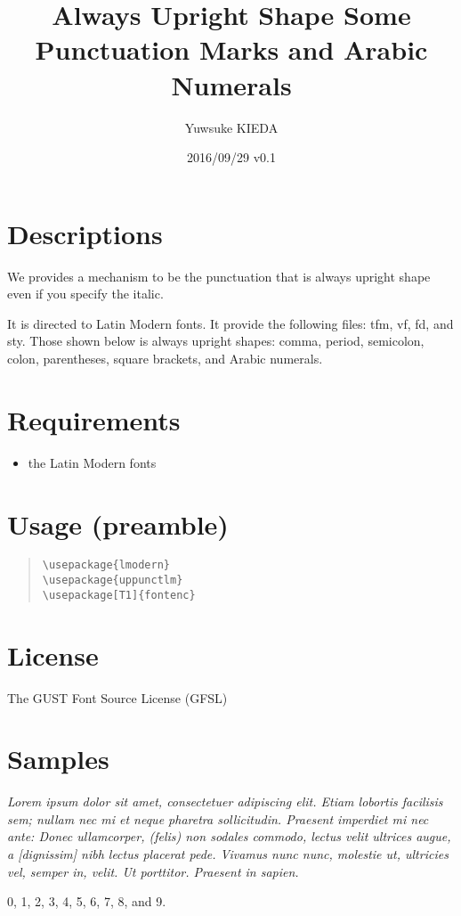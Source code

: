 \documentclass{article}
\title{Always Upright Shape Some Punctuation Marks and Arabic Numerals}
\author{Yuwsuke KIEDA}
\date{2016/09/29 v0.1}
\begin{document}
\maketitle

\section{Descriptions}

We provides a mechanism to be the punctuation that is always upright
shape even if you specify the italic.

It is directed to Latin Modern fonts.
It provide the following files: tfm, vf, fd, and sty.
Those shown below is always upright shapes:
comma, period, semicolon, colon, parentheses, square brackets,
and Arabic numerals.

\section{Requirements}

\begin{itemize}
 \item the Latin Modern fonts
\end{itemize}

\section{Usage (preamble)}

\begin{quote}
\begin{verbatim}
\usepackage{lmodern}
\usepackage{uppunctlm}
\usepackage[T1]{fontenc}
\end{verbatim}
\end{quote}

\section{License}

The GUST Font Source License (GFSL)

\section{Samples}

\itshape
Lorem ipsum dolor sit amet, consectetuer adipiscing elit.
Etiam lobortis facilisis sem;
nullam nec mi et neque pharetra sollicitudin.
Praesent imperdiet mi nec ante:
Donec ullamcorper, (felis) non sodales commodo,
lectus velit ultrices augue, a [dignissim] nibh lectus placerat pede.
Vivamus nunc nunc, molestie ut, ultricies vel, semper in, velit.
Ut porttitor. Praesent in sapien.

0, 1, 2, 3, 4, 5, 6, 7, 8, and 9.
\end{document}
